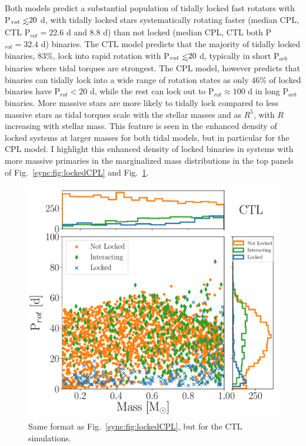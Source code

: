 Both models predict a substantial population of tidally locked fast rotators with P$_{rot} \lsim 20$ d, with tidally locked stars systematically rotating faster (median CPL, CTL P$_{rot} = 22.6$ d and $8.8$ d) than not locked (median CPL, CTL both P$_{rot} = 32.4$ d) binaries. The CTL model predicts that the majority of tidally locked binaries, $83\%$, lock into rapid rotation with P$_{rot} \lsim 20$ d, typically in short P$_{orb}$ binaries where tidal torques are strongest. The CPL model, however predicts that binaries can tidally lock into a wide range of rotation states as only $46\%$ of locked binaries have P$_{rot} < 20$ d, while the rest can lock out to P$_{rot} \approx 100$ d in long P$_{orb}$ binaries. More massive stars are more likely to tidally lock compared to less massive stars as tidal torques scale with the stellar masses and as $R^5$, with $R$ increasing with stellar mass.  This feature is seen in the enhanced density of locked systems at larger masses for both tidal models, but in particular for the CPL model. I highlight this enhanced density of locked binaries in systems with more massive primaries in the marginalized mass distributions in the top panels of Fig.~\ref{sync:fig:lockedCPL} and Fig.~\ref{sync:fig:lockedCTL}.

\begin{figure}
	\includegraphics[width=\columnwidth]{lockedCTL.pdf}
   \caption{Same format as Fig.~\ref{sync:fig:lockedCPL}, but for the CTL simulations.}%
    \label{sync:fig:lockedCTL}%
\end{figure}

